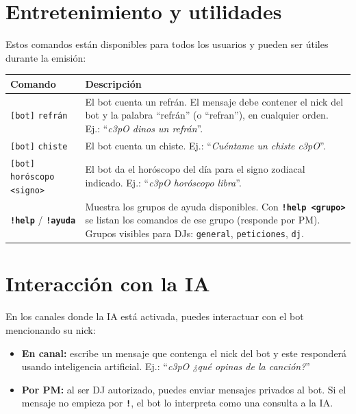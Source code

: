 \documentclass[a4paper,11pt]{article}
\newcommand{\cmd}[1]{\texttt{\color{cmdcolor}\bfseries #1}}
\newcommand{\param}[1]{\texttt{\color{paramcolor}<#1>}}
\renewcommand{\bot}[0]{\texttt{[bot]}}
\begin{document}
\section{Entretenimiento y utilidades}

Estos comandos están disponibles para todos los usuarios y pueden ser útiles durante la emisión:

\begin{tabularx}{\textwidth}{lX}
\toprule
\textbf{Comando} & \textbf{Descripción} \\
\midrule
\bot{} \texttt{refrán} & El bot cuenta un refrán. El mensaje debe contener el nick del bot y la palabra ``refrán'' (o ``refran''), en cualquier orden. Ej.: ``\textit{c3pO dinos un refrán}''. \\[0.3em]
\bot{} \texttt{chiste} & El bot cuenta un chiste. Ej.: ``\textit{Cuéntame un chiste c3pO}''. \\[0.3em]
\bot{} \texttt{horóscopo} \param{signo} & El bot da el horóscopo del día para el signo zodiacal indicado. Ej.: ``\textit{c3pO horóscopo libra}''. \\[0.3em]
\cmd{!help} / \cmd{!ayuda} & Muestra los grupos de ayuda disponibles. Con \cmd{!help \param{grupo}} se listan los comandos de ese grupo (responde por PM). Grupos visibles para DJs: \texttt{general}, \texttt{peticiones}, \texttt{dj}. \\
\bottomrule
\end{tabularx}

\section{Interacción con la IA}

En los canales donde la IA está activada, puedes interactuar con el bot mencionando su nick:

\begin{itemize}[leftmargin=2em]
  \item \textbf{En canal:} escribe un mensaje que contenga el nick del bot y este responderá usando inteligencia artificial. Ej.: ``\textit{c3pO ¿qué opinas de la canción?}''
  \item \textbf{Por PM:} al ser DJ autorizado, puedes enviar mensajes privados al bot. Si el mensaje no empieza por \cmd{!}, el bot lo interpreta como una consulta a la IA.
\end{itemize}
\end{document}
